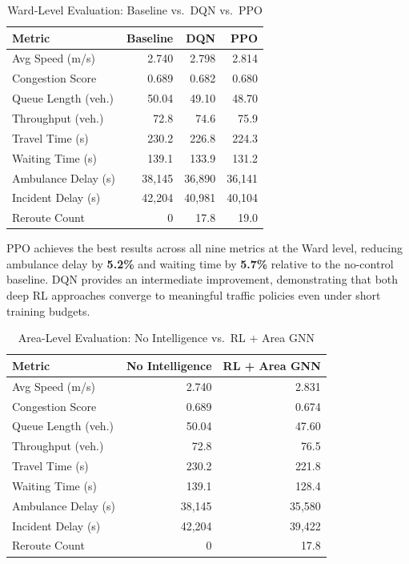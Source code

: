 \documentclass[conference]{IEEEtran}
\begin{document}
\begin{table}[h]
\centering
\caption{Ward-Level Evaluation: Baseline vs.\ DQN vs.\ PPO}
\label{tab:ward_results}
\begin{tabular}{@{}lrrr@{}}
\toprule
\textbf{Metric} & \textbf{Baseline} & \textbf{DQN} & \textbf{PPO} \\ \midrule
Avg Speed (m/s)        & 2.740 & 2.798 & 2.814 \\
Congestion Score       & 0.689 & 0.682 & 0.680 \\
Queue Length (veh.)    & 50.04 & 49.10 & 48.70 \\
Throughput (veh.)      & 72.8  & 74.6  & 75.9  \\
Travel Time (s)        & 230.2 & 226.8 & 224.3 \\
Waiting Time (s)       & 139.1 & 133.9 & 131.2 \\
Ambulance Delay (s)    & 38{,}145 & 36{,}890 & 36{,}141 \\
Incident Delay (s)     & 42{,}204 & 40{,}981 & 40{,}104 \\
Reroute Count          & 0     & 17.8  & 19.0  \\
\bottomrule
\end{tabular}
\end{table}

PPO achieves the best results across all nine metrics at the Ward level, reducing ambulance delay by \textbf{5.2\%} and waiting time by \textbf{5.7\%} relative to the no-control baseline. DQN provides an intermediate improvement, demonstrating that both deep RL approaches converge to meaningful traffic policies even under short training budgets.

\begin{table}[h]
\centering
\caption{Area-Level Evaluation: No Intelligence vs.\ RL + Area GNN}
\label{tab:area_results}
\begin{tabular}{@{}lrr@{}}
\toprule
\textbf{Metric} & \textbf{No Intelligence} & \textbf{RL + Area GNN} \\ \midrule
Avg Speed (m/s)        & 2.740 & 2.831 \\
Congestion Score       & 0.689 & 0.674 \\
Queue Length (veh.)    & 50.04 & 47.60 \\
Throughput (veh.)      & 72.8  & 76.5  \\
Travel Time (s)        & 230.2 & 221.8 \\
Waiting Time (s)       & 139.1 & 128.4 \\
Ambulance Delay (s)    & 38{,}145 & 35{,}580 \\
Incident Delay (s)     & 42{,}204 & 39{,}422 \\
Reroute Count          & 0     & 17.8  \\
\bottomrule
\end{tabular}
\end{table}
\end{document}
